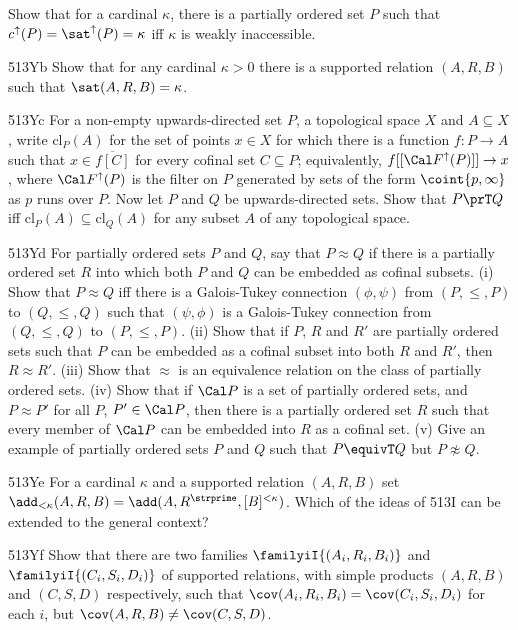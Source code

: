{
Show that for a cardinal $\kappa$, there is a partially ordered set $P$
such that $c^{\uparrow}(P)=\sat^{\uparrow}(P)=\kappa$ iff $\kappa$ is 
weakly inaccessible.   

\spheader 513Yb Show that for any cardinal $\kappa>0$ there is a
supported relation $(A,R,B)$ such that $\sat(A,R,B)=\kappa$.

\spheader 513Yc For a non-empty upwards-directed set $P$, a topological
space $X$ and $A\subseteq X$, write $\text{cl}_{P}(A)$ for the set of
points $x\in X$ for which there is a function $f:P\to A$ such that
$x\in\overline{f[C]}$ for every cofinal set $C\subseteq P$;
equivalently, $f[[\Cal F^{\uparrow}(P)]]\to x$, where
$\Cal F^{\uparrow}(P)$ is the filter on $P$ generated by sets of the
form $\coint{p,\infty}$ as $p$ runs over $P$.   Now let $P$ and $Q$ be
upwards-directed sets.   Show that $P\prT Q$ iff
$\text{cl}_P(A)\subseteq\text{cl}_Q(A)$ for any subset $A$ of any
topological space.

\spheader 513Yd For partially ordered sets $P$ and $Q$, say that
$P\approx Q$ if there is a partially ordered set $R$ into which both $P$
and $Q$ can be embedded as cofinal subsets.
(i) Show that $P\approx Q$ iff there is a Galois-Tukey connection
$(\phi,\psi)$ from $(P,\le,P)$ to $(Q,\le,Q)$ such that $(\psi,\phi)$
is a Galois-Tukey connection from $(Q,\le,Q)$ to $(P,\le,P)$.
(ii) Show that if $P$, $R$ and
$R'$ are partially ordered sets such that $P$ can be embedded as a cofinal
subset into both $R$ and $R'$, then $R\approx R'$.   (iii) Show that
$\approx$ is an equivalence relation on the class of partially ordered
sets.   (iv) Show that if $\Cal P$ is a set of partially ordered sets,
and $P\approx P'$ for all $P$, $P'\in\Cal P$, then there is a partially
ordered set $R$ such that every member of $\Cal P$ can be embedded into $R$
as a cofinal set.   (v) Give an example of partially ordered sets $P$
and $Q$ such that $P\equivT Q$ but $P\not\approx Q$.

\spheader 513Ye For a cardinal $\kappa$ and a supported relation
$(A,R,B)$ set
$\add_{<\kappa}(A,R,B)=\add(A,R^{\strprime},[B]^{<\kappa})$.   Which of
the ideas of 513I can be extended to the general context?

\spheader 513Yf
Show that there are two families
$\familyiI{(A_i,R_i,B_i)}$ and
$\familyiI{(C_i,S_i,D_i)}$ of supported relations, with simple products
$(A,R,B)$ and $(C,S,D)$ respectively, such that
$\cov(A_i,R_i,B_i)=\cov(C_i,S_i,D_i)$ for each $i$, but
$\cov(A,R,B)\ne\cov(C,S,D)$.   

}
